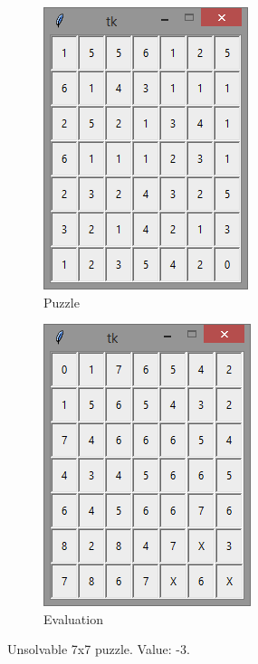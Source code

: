 \documentclass[12pt]{article}
\begin{document}
\begin{figure}[H]
	\begin{subfigure}{.5\textwidth}
		\centering
     		\includegraphics[width = .6\linewidth]{7x7_puzzle_-3}
     		\caption{Puzzle}
     		\label{fig5:sfig1}
	\end{subfigure}
	\begin{subfigure}{.5\textwidth}
		\centering
		\includegraphics[width = .6\linewidth]{7x7_eval_-3}
		\caption{Evaluation}
		\label{fig5:sfig2}
	\end{subfigure}
\caption{Unsolvable 7x7 puzzle. Value: -3.}
\label{fig:7x7bad}
\end{figure}
\end{document}
